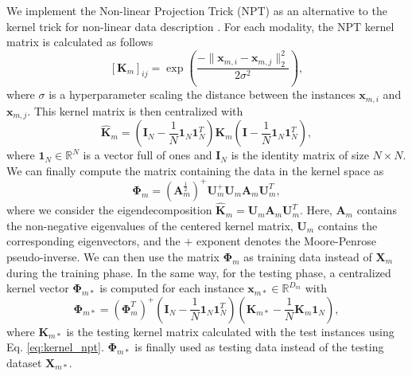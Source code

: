 We implement the Non-linear Projection Trick (NPT) as an alternative to the kernel trick for non-linear data description \cite{6584012}. For each modality, the NPT kernel matrix is calculated as follows
\begin{equation}\label{eq:kernel_npt}
[\mathbf{K}_{m}]_{ij} = \exp  \left( \frac{ -\| \mathbf{x}_{m,i} - \mathbf{x}_{m,j}\|_2^2 }{ 2\sigma^2 } \right),
\end{equation}
where $\sigma$ is a hyperparameter scaling the distance between the instances $\mathbf{x}_{m, i}$ and $\mathbf{x}_{m, j}$. This kernel matrix is then centralized with
\begin{equation}\label{eq:kernel_npt_centr}
    \hat{\mathbf{K}}_m = (\mathbf{I}_N - \frac{1}{N}\mathbf{1}_N\mathbf{1}^T_N)\mathbf{K}_m(\mathbf{I} - \frac{1}{N}\mathbf{1}_N\mathbf{1}^T_N),
\end{equation}
where $\mathbf{1}_N \in \mathbb{R}^N$ is a vector full of ones and $\mathbf{I}_N$ is the identity matrix of size $N\times N$. We can finally compute the matrix containing the data in the kernel space as
\begin{equation}\label{eq:kernel_space}
    \boldsymbol{\Phi}_m = (\mathbf{A}_m^{\frac{1}{2}})^{+}\mathbf{U}_m^{+}\mathbf{U}_m\mathbf{A}_m\mathbf{U}_m^T,
\end{equation}
where we consider the eigendecomposition $\hat{\mathbf{K}}_m = \mathbf{U}_m \mathbf{A}_m \mathbf{U}_m^T$. Here, $\mathbf{A}_m$ contains the non-negative eigenvalues of the centered kernel matrix, $\mathbf{U}_m$ contains the corresponding eigenvectors, and the $+$ exponent denotes the Moore-Penrose pseudo-inverse. We can then use the matrix $\boldsymbol{\Phi}_m$ as training data instead of $\mathbf{X}_m$ during the training phase. In the same way, for the testing phase, a centralized kernel vector $\boldsymbol{\Phi}_{m*}$ is computed for each instance $\mathbf{x}_{m*} \in \mathbb{R}^{D_m}$ with
\begin{equation}\label{test_npt}
    \boldsymbol{\Phi}_{m*} = (\boldsymbol{\Phi}_m^T)^{+}(\mathbf{I}_N - \frac{1}{N}\mathbf{1}_N\mathbf{1}^T_N)\left(\mathbf{K}_{m*} - \frac{1}{N} \mathbf{K}_m \mathbf{1}_N\right),
\end{equation}
where $\mathbf{K}_{m*}$ is the testing kernel matrix calculated with the test instances using Eq. \ref{eq:kernel_npt}. $\boldsymbol{\Phi}_{m*}$ is finally used as testing data instead of the testing dataset $\mathbf{X}_{m*}$.  


